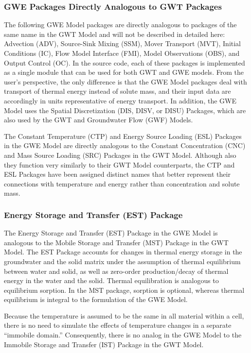 \subsubsection{GWE Packages Directly Analogous to GWT Packages}

The following GWE Model packages are directly analogous to packages of the same name in the GWT Model and will not be described in detailed here: Advection (ADV), Source-Sink Mixing (SSM), Mover Transport (MVT), Initial Conditions (IC), Flow Model Interface (FMI), Model Observations (OBS), and Output Control (OC). In the \mf source code, each of these packages is implemented as a single module that can be used for both GWT and GWE models. From the user's perspective, the only difference is that the GWE Model packages deal with transport of thermal energy instead of solute mass, and their input data are accordingly in units representative of energy transport. In addition, the GWE Model uses the Spatial Discretization (DIS, DISV, or DISU) Packages, which are also used by the GWT and Groundwater Flow (GWF) Models.

The Constant Temperature (CTP) and Energy Source Loading (ESL) Packages in the GWE Model are directly analogous to the Constant Concentration (CNC) and Mass Source Loading (SRC) Packages in the GWT Model. Although also they function very similarly to their GWT Model counterparts, the CTP and ESL Packages have been assigned distinct names that better represent their connections with temperature and energy rather than concentration and solute mass.

\subsubsection{Energy Storage and Transfer (EST) Package}

The Energy Storage and Transfer (EST) Package in the GWE Model is analogous to the Mobile Storage and Transfer (MST) Package in the GWT Model. The EST Package accounts for changes in thermal energy storage in the groundwater and the solid matrix under the assumption of thermal equilibrium between water and solid, as well as zero-order production/decay of thermal energy in the water and the solid. Thermal equilibration is analogous to equilibrium sorption. In the MST package, sorption is optional, whereas thermal equilibrium is integral to the formulation of the GWE Model.

Because the temperature is assumed to be the same in all material within a cell, there is no need to simulate the effects of temperature changes in a separate ``immobile domain.'' Consequently, there is no analog in the GWE Model to the Immobile Storage and Transfer (IST) Package in the GWT Model.

